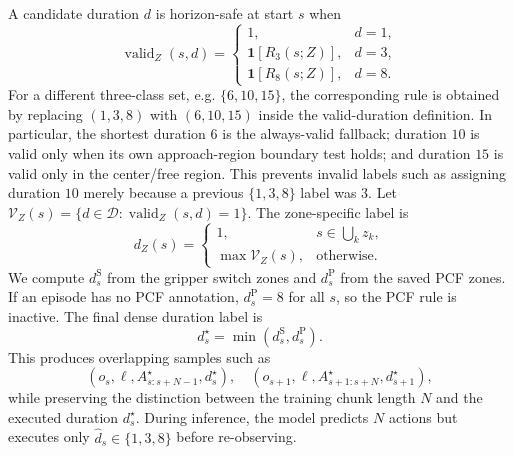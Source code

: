 \documentclass[10pt,twocolumn,letterpaper]{article}
\begin{document}
A candidate duration $d$ is horizon-safe at start $s$ when
\begin{equation}
\operatorname{valid}_Z(s,d)=
\begin{cases}
1, & d=1,\\
\mathbf{1}[R_3(s;Z)], & d=3,\\
\mathbf{1}[R_8(s;Z)], & d=8.
\end{cases}
\end{equation}
For a different three-class set, e.g. $\{6,10,15\}$, the corresponding rule is obtained by replacing $(1,3,8)$ with $(6,10,15)$ inside the valid-duration definition. In particular, the shortest duration $6$ is the always-valid fallback; duration $10$ is valid only when its own approach-region boundary test holds; and duration $15$ is valid only in the center/free region. This prevents invalid labels such as assigning duration $10$ merely because a previous $\{1,3,8\}$ label was $3$.
Let $\mathcal{V}_Z(s)=\{d\in\mathcal{D}:\operatorname{valid}_Z(s,d)=1\}$. The zone-specific label is
\begin{equation}
d_Z(s)=
\begin{cases}
1, & s\in \bigcup_k z_k,\\
\max \mathcal{V}_Z(s), & \text{otherwise}.
\end{cases}
\end{equation}
We compute $d_s^{\mathrm{S}}$ from the gripper switch zones and $d_s^{\mathrm{P}}$ from the saved PCF zones. If an episode has no PCF annotation, $d_s^{\mathrm{P}}=8$ for all $s$, so the PCF rule is inactive. The final dense duration label is
\begin{equation}
d_s^\star=\min(d_s^{\mathrm{S}},d_s^{\mathrm{P}}).
\end{equation}
This produces overlapping samples such as
\begin{equation}
(o_s,\ell,A^{\star}_{s:s+N-1},d_s^{\star}),
\quad
(o_{s+1},\ell,A^{\star}_{s+1:s+N},d_{s+1}^{\star}),
\end{equation}
while preserving the distinction between the training chunk length $N$ and the executed duration $d_s^{\star}$. During inference, the model predicts $N$ actions but executes only $\hat d_s\in\{1,3,8\}$ before re-observing.
\end{document}
